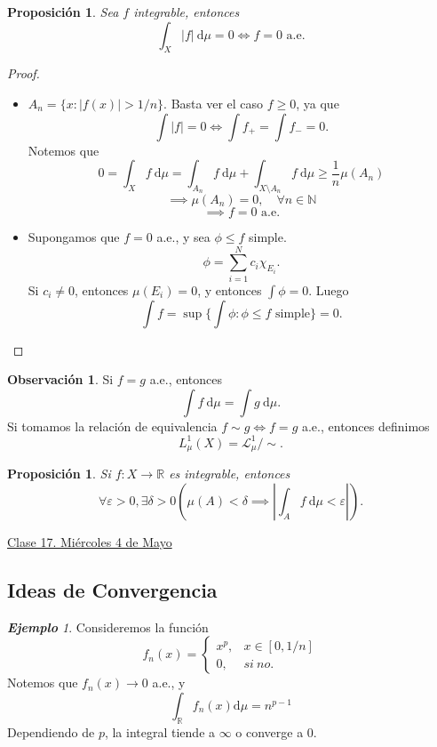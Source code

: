 \documentclass{article}
\newtheorem{proposition}[theorem]{Proposición}
\theoremstyle{definition}
\newtheorem*{obs}{Observación}
\theoremstyle{remark}
\newtheorem{example}[theorem]{\textbf{Ejemplo}}
\numberwithin{equation}{section}
\newcommand{\N}{\mathbb{N}}
\newcommand{\R}{\mathbb{R}}
\renewcommand{\d}{\mathrm{d}}
\newcommand{\e}{\varepsilon}
\newcommand{\oo}{\infty}
\newcommand{\abs}[1]{\left| #1 \right|}
\newcommand{\br}[1]{\left( #1 \right)}
\newcommand{\fecha}[1]{\begin{flushright} \underline{#1} \end{flushright}}
\begin{document}
\begin{proposition}
  Sea $f$ integrable, entonces 
  \[ \int_X \abs f \ \mathrm{d}\mu = 0 \iff f = 0 \text{ a.e.} \]
\end{proposition}
\begin{proof}
  \ \begin{itemize}
    \item \boxed{\implies} $A_n = \{x \colon \abs{f(x)} > 1/n\}$. Basta ver el caso $f \geq 0$, ya que 
    \[ \int \abs f = 0 \iff \int f_+ = \int f_- = 0. \]
    Notemos que 
    \[ 0 = \int_X f \ \mathrm{d}\mu = \int_{A_n} f \ \mathrm{d}\mu + \int_{X \setminus A_n} f \ \mathrm{d}\mu \geq \frac1n \mu(A_n) \]
    \[ \implies \mu(A_n) = 0, \quad \forall n \in \N \]
    \[\implies f = 0 \text{ a.e.}\]

    \item \boxed{\impliedby} Supongamos que $f = 0$ a.e., y sea $\phi \leq f$ simple. 
    \[ \phi = \sum_{i=1}^N c_i \chi_{E_i}. \]
    Si $c_i \neq 0$, entonces $\mu(E_i) = 0$, y entonces $\int \phi = 0$. Luego 
    \[ \int f = \sup\{\int \phi \colon \phi \leq f \text{ simple}\} = 0. \]
  \end{itemize}
\end{proof}

\begin{obs}
  Si $f=g$ a.e., entonces 
  \[ \int f \ \mathrm{d}\mu = \int g \ \mathrm{d}\mu. \]
  Si tomamos la relación de equivalencia $f \sim g \iff f=g$ a.e., entonces definimos
  \[ L_\mu^1(X) = \mathcal{L}_\mu^1/\sim. \]
\end{obs}

\begin{proposition}
  Si $f \colon X \to \R$ es integrable, entonces 
  \[ \forall \e>0, \exists \delta>0 \br{\mu(A) < \delta \implies \abs{\int_A f \ \d\mu < \e}}. \]
\end{proposition}

\fecha{Clase 17. Miércoles 4 de Mayo}

\subsection{Ideas de Convergencia}

\begin{example}
  Consideremos la función
  \[ f_n(x) = \begin{cases}
    x^p, &x \in [0,1/n] \\
    0, &si \ no.
  \end{cases} \]
  Notemos que $f_n(x) \to 0$ a.e., y 
  \[ \int_\R f_n(x) \d\mu = n^{p-1} \]
  Dependiendo de $p$, la integral tiende a $\oo$ o converge a 0.
\end{example}
\end{document}
